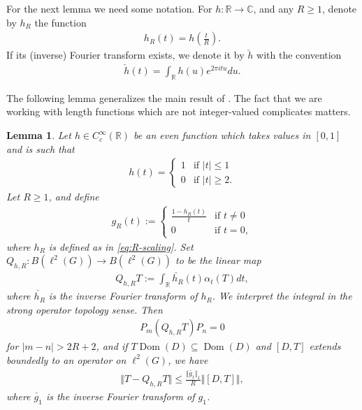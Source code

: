 \documentclass[12pt,a4paper,oneside,final,reqno]{amsart}
\newcommand{\C}{\mathbb{C}}
\newcommand{\R}{\mathbb{R}}
\theoremstyle{plain}
\newtheorem{lemma}[theorem]{Lemma}
\theoremstyle{definition}
\begin{document}
For the next lemma we need some notation. 
For $h \colon \R \to \C$, and any $R \geq 1$, denote by $h_R$ the function
\begin{align}\label{eq:R-scaling}
    h_R(t) = h(\frac{t}{R}).
\end{align}
If its (inverse) Fourier transform exists, we denote it by $\check{h}$ with the convention
\begin{align}\label{eq:inv-FT-convention}
    \check{h}(t) = \int_\R h(u) e^{2\pi itu} du.
\end{align}

The following lemma generalizes the main result of \cite[Section 2]{OzawaRieffel2005}. The fact that we are working with length functions which are not integer-valued complicates matters.


\begin{lemma}\label{lemma:smooth-offdiagonal-cutoff}
    Let $h \in C^\infty_c(\R)$ be an even function which takes values in $[0,1]$ and is such that 
    \begin{align*}
        h(t) = \begin{cases}
            1 & \text{if $|t|\leq 1$} \\
            0 & \text{if $|t| \geq 2$} .
        \end{cases}
    \end{align*}
    Let $R \geq 1$, and define
    \begin{align*}
        g_{R}(t) := 
        \begin{cases}
            \frac{1-h_R(t)}{t} & \text{if $t\neq 0$} \\
            0 & \text{if $t = 0$},
        \end{cases}
    \end{align*}
    where $h_R$ is defined as in \eqref{eq:R-scaling}. 
    Set $Q_{h,R} \colon B(\ell^2(G)) \to B(\ell^2(G))$ to be the linear map
    \begin{align*}
        Q_{h,R} T := \int_\R  \check{h_R}(t) \alpha_t(T) dt,
    \end{align*}
    where $\check{h_R}$ is the inverse Fourier transform of $h_R$. We interpret the integral in the strong operator topology sense. 
    Then 
    \begin{align*}
        P_m ( Q_{h,R}T) P_n = 0
    \end{align*}
    for $|m-n| > 2R+2$, and if $T \operatorname{Dom}(D) \subseteq \operatorname{Dom}(D)$ and $[D,T]$ extends boundedly to an operator on $\ell^2(G)$, we have
    \begin{align*}
        \Vert T - Q_{h,R}T \Vert \leq \frac{\Vert \check{g_1}\Vert_1}{R} \Vert [D,T] \Vert,
    \end{align*}
    where $\check{g_1}$ is the inverse Fourier transform of $g_1$.
\end{lemma}
\end{document}
